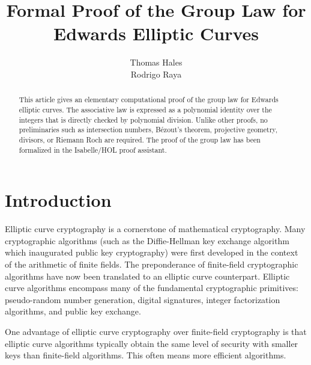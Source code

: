 \documentclass{llncs}
\title{Formal Proof of the Group Law for Edwards Elliptic Curves}
\author{Thomas Hales\\Rodrigo Raya}
\date{}
\begin{document}
\maketitle

\begin{abstract} 
  This article gives an elementary computational proof of the group
  law for Edwards elliptic curves. The associative law is expressed as
  a polynomial identity over the integers that is directly checked by
  polynomial division.  Unlike other proofs, no preliminaries such as
  intersection numbers, B\'ezout's theorem, projective geometry,
  divisors, or Riemann Roch are required.  The proof of the group law
  has been formalized in the Isabelle/HOL proof assistant.
\end{abstract}

\baselineskip
{}\baselineskip

\newenvironment{blockquote}{%
  \par%
  \medskip%
  \baselineskip=0.7\baselineskip%
  \leftskip=2em\rightskip=2em%
  \noindent\ignorespaces}{%
  \par\medskip}


\section{Introduction}

Elliptic curve cryptography is a cornerstone of mathematical
cryptography.  Many cryptographic algorithms (such as the
Diffie-Hellman key exchange algorithm which inaugurated public key
cryptography) were first developed in the context of the arithmetic of
finite fields.  The preponderance of finite-field cryptographic
algorithms have now been translated to an elliptic curve counterpart.
Elliptic curve algorithms encompass many of the fundamental
cryptographic primitives: pseudo-random number generation, digital
signatures, integer factorization algorithms, and public key exchange.

One advantage of elliptic curve cryptography over finite-field
cryptography is that elliptic curve algorithms typically obtain the same
level of security with smaller keys than finite-field algorithms.
This often means more efficient algorithms.
\end{document}
